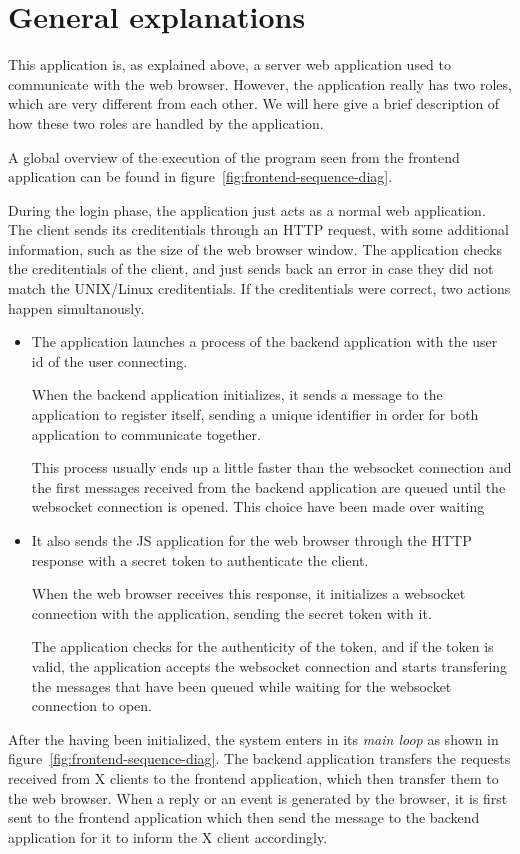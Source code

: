 \section{General explanations}
% 
This application is, as explained above, a server web application used to 
communicate with the web browser. However, the application really has two 
roles, which are very different from each other. We will here give a brief 
description of how these two roles are handled by the application.

A global overview of the execution of the program seen from the frontend 
application can be found in figure~\ref{fig:frontend-sequence-diag}.


During the login phase, the application just acts as a normal web 
application. The client sends its creditentials through an HTTP request,
with some additional information, such as the size of the web browser 
window. The application checks the creditentials of the client, and 
just sends back an error in case they did not match the UNIX/Linux 
creditentials. If the creditentials were correct, two actions happen 
simultanously. 
\begin{itemize}
\item The application launches a process of the backend 
  application with the user id of the user connecting.
  
  When the backend application initializes, it sends a message to 
  the application to register itself, sending a unique identifier 
  in order for both application to communicate together. 

  This process usually ends up a little faster than the websocket connection and 
  the first messages received from the backend application are queued until 
  the websocket connection is opened. This choice have been made over waiting 
\item It also sends the JS application for the web browser through the HTTP 
  response with a secret token to authenticate the client. 
  
  When the web browser receives this response, it initializes a websocket 
  connection with the application, sending the secret token with it. 

  The application checks for the authenticity of the token, and if the token is valid, 
  the application accepts the websocket connection and starts transfering the messages 
  that have been queued while waiting for the websocket connection to open.
\end{itemize}

After the having been initialized, the system enters in its \emph{main loop} as shown 
in figure~\ref{fig:frontend-sequence-diag}. The backend application transfers the 
requests received from X clients to the frontend application, which then transfer 
them to the web browser. When a reply or an event is generated by the browser, 
it is first sent to the frontend application which then send the message to the backend 
application for it to inform the X client accordingly.
